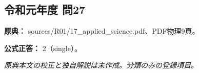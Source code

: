 \subsection{令和元年度 問27}
\label{q:r01-reg-applied-27}

\noindent\textbf{原典：} sources/R01/17\_applied\_science.pdf、PDF物理9頁。

\textbf{公式正答：} 2（single）。

\par\textit{原典本文の校正と独自解説は未作成。分類のみの登録項目。}
